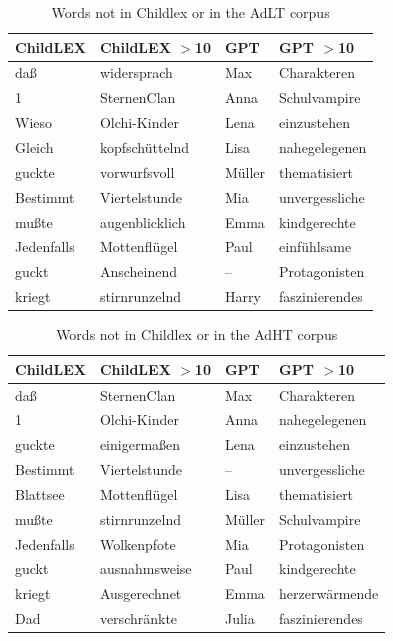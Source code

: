 \documentclass[doc, a4paper]{apa7}
\begin{document}
\begin{table}[!htbp]
\caption{Words not in Childlex or in the AdLT corpus}
\centering
\begin{tabular}{llll}
  \hline
ChildLEX & ChildLEX $>$10 & GPT & GPT $>$10 \\ 
  \hline
daß & widersprach & Max & Charakteren \\ 
  1 & SternenClan & Anna & Schulvampire \\ 
  Wieso & Olchi-Kinder & Lena & einzustehen \\ 
  Gleich & kopfschüttelnd & Lisa & nahegelegenen \\ 
  guckte & vorwurfsvoll & Müller & thematisiert \\ 
  Bestimmt & Viertelstunde & Mia & unvergessliche \\ 
  mußte & augenblicklich & Emma & kindgerechte \\ 
  Jedenfalls & Mottenflügel & Paul & einfühlsame \\ 
  guckt & Anscheinend & – & Protagonisten \\ 
  kriegt & stirnrunzelnd & Harry & faszinierendes \\ 
   \hline
\end{tabular}
\label{words-adlt}
\end{table}

\begin{table}[!htbp]
\caption{Words not in Childlex or in the AdHT corpus}
\centering
\begin{tabular}{llll}
  \hline
ChildLEX & ChildLEX $>$10 & GPT & GPT $>$10 \\ 
  \hline
daß & SternenClan & Max & Charakteren \\ 
  1 & Olchi-Kinder & Anna & nahegelegenen \\ 
  guckte & einigermaßen & Lena & einzustehen \\ 
  Bestimmt & Viertelstunde & – & unvergessliche \\ 
  Blattsee & Mottenflügel & Lisa & thematisiert \\ 
  mußte & stirnrunzelnd & Müller & Schulvampire \\ 
  Jedenfalls & Wolkenpfote & Mia & Protagonisten \\ 
  guckt & ausnahmsweise & Paul & kindgerechte \\ 
  kriegt & Ausgerechnet & Emma & herzerwärmende \\ 
  Dad & verschränkte & Julia & faszinierendes \\ 
   \hline
\end{tabular}
\label{words-adht}
\end{table}
\end{document}
